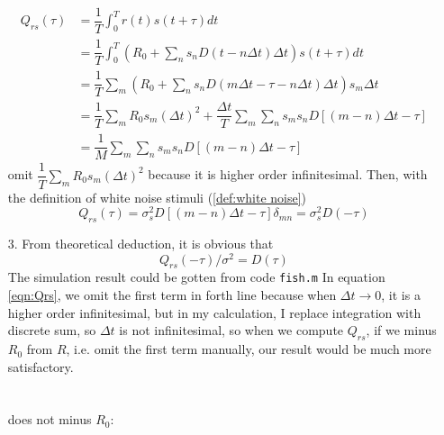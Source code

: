 \documentclass{article}
\begin{document}
\begin{enumerate}
          \begin{equation}
              \begin{split}\label{eqn:Qrs}
                  Q_{rs}(\tau) &= \dfrac{1}{T}\int^T_0 r(t)s(t+\tau)dt\\
                  &=\dfrac{1}{T}\int^T_0 (R_0+\sum_{n} s_n D(t-n\Delta t)\Delta t)s(t+\tau)dt\\
                  &= \dfrac{1}{T}\sum_m(R_0+\sum_{n} s_n D(m\Delta t -\tau-n\Delta t)\Delta t)s_m\Delta t\\
                  &= \dfrac{1}{T}\sum_m R_0 s_m(\Delta t)^2+\dfrac{\Delta t}{T}\sum_m \sum_n s_m s_n D[(m-n)\Delta t -\tau]\\
                  &=\dfrac{1}{M}\sum_m \sum_n s_m s_n D[(m-n)\Delta t -\tau]
              \end{split}
          \end{equation}
          omit $\dfrac{1}{T}\sum_m R_0 s_m(\Delta t)^2$ because it is higher order infinitesimal.
          Then, with the definition of white noise stimuli (\ref{def:white noise})
          \begin{equation}
              Q_{rs}(\tau) = \sigma_s^2 D[(m-n)\Delta t-\tau]\delta _{mn}=\sigma_s^2D(-\tau)
          \end{equation}
    \item[3.] From theoretical deduction, it is obvious that
          \begin{equation}
              Q_{rs}(-\tau)/\sigma^2 = D(\tau)
          \end{equation}
          The simulation result could be gotten from code \texttt{fish.m}
          In equation \ref{eqn:Qrs}, we omit the first term in forth line because when $\Delta t \rightarrow 0$, it is
          a higher order infinitesimal, but in my calculation, I replace integration with discrete sum, so
          $\Delta t$ is not infinitesimal, so when we compute $Q_{rs}$, if we minus $R_0$ from $R$, i.e. omit
          the first term manually, our result would be much more satisfactory.
          \\
          \\
          \\
          does not minus $R_0$:\\

\end{enumerate}
\end{document}
